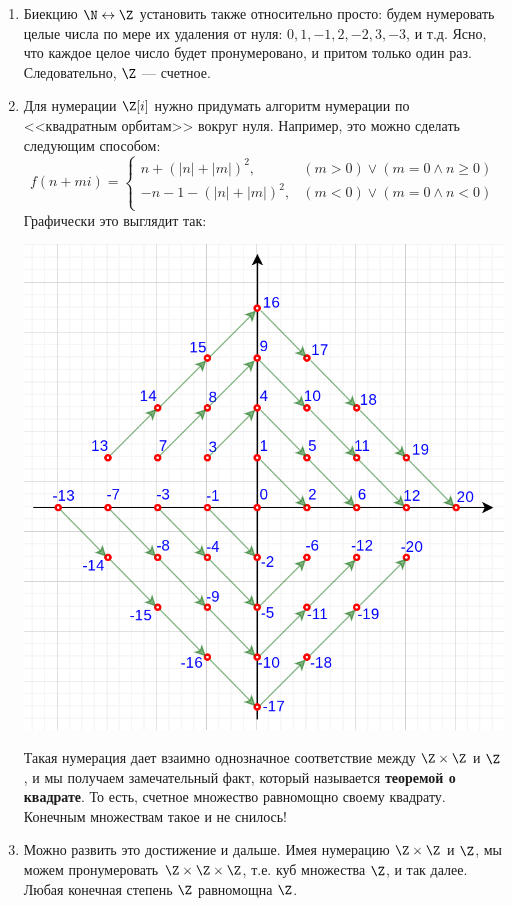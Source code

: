 \begin{enumerate}
\item Биекцию $\N\leftrightarrow\Z$ установить также относительно просто: будем нумеровать целые числа по мере их удаления от нуля: $0, 1, -1, 2, -2, 3, -3$, и т.д. Ясно, что каждое целое число будет пронумеровано, и притом только один раз. Следовательно, $\Z$ --- счетное.
\item Для нумерации $\Z[i]$ нужно придумать алгоритм нумерации по <<квадратным орбитам>> вокруг нуля. Например, это можно сделать следующим способом:
$$
f(n+mi) = \begin{cases}
n+(|n|+|m|)^2, & (m>0)\lor(m=0\land n\ge 0) \\
-n-1-(|n|+|m|)^2, & (m<0)\lor(m=0\land n< 0) \\
\end{cases}
$$
Графически это выглядит так:
\begin{center}
\includegraphics[scale=0.3]{ZZnumero.png}
\end{center}
Такая нумерация дает взаимно однозначное соответствие между $\Z\times\Z$ и $\Z$, и мы получаем замечательный факт, который называется \textbf{теоремой о квадрате}. То есть, счетное множество равномощно своему квадрату. Конечным множествам такое и не снилось!
\item Можно развить это достижение и дальше. Имея нумерацию $\Z\times\Z$ и $\Z$, мы можем пронумеровать $\Z\times\Z\times\Z$, т.е. куб множества $\Z$, и так далее. Любая конечная степень $\Z$ равномощна $\Z$.

\end{enumerate}
